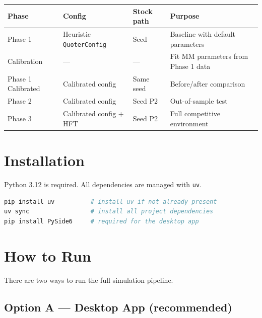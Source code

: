\documentclass[12pt,a4paper]{article}
\begin{document}
\begin{center}
\begin{tabular}{llll}
\toprule
\textbf{Phase} & \textbf{Config} & \textbf{Stock path} & \textbf{Purpose} \\
\midrule
Phase 1            & Heuristic \texttt{QuoterConfig}    & Seed    & Baseline with default parameters \\
Calibration        & ---                                 & ---     & Fit MM parameters from Phase 1 data \\
Phase 1 Calibrated & Calibrated config                  & Same seed & Before/after comparison \\
Phase 2            & Calibrated config                  & Seed P2 & Out-of-sample test \\
Phase 3            & Calibrated config + HFT            & Seed P2 & Full competitive environment \\
\bottomrule
\end{tabular}
\end{center}

\section{Installation}

Python 3.12 is required. All dependencies are managed with \texttt{uv}.

\begin{lstlisting}[language=bash]
pip install uv          # install uv if not already present
uv sync                 # install all project dependencies
pip install PySide6     # required for the desktop app
\end{lstlisting}

\section{How to Run}

There are two ways to run the full simulation pipeline.

\subsection{Option A --- Desktop App (recommended)}
\end{document}
